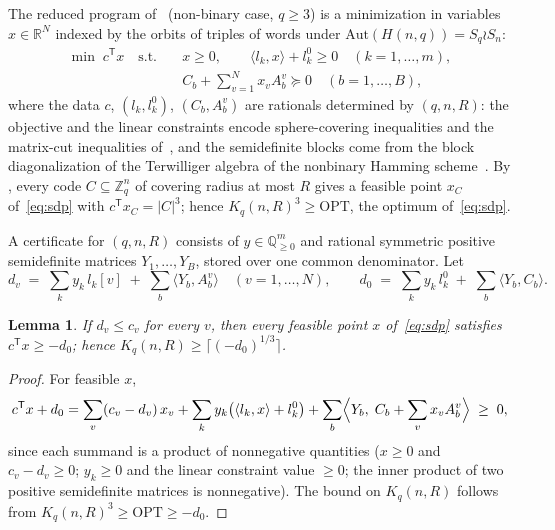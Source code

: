 \documentclass[11pt]{amsart}
\newtheorem{lemma}[theorem]{Lemma}
\newcommand{\Zq}{\mathbb{Z}_q}
\begin{document}
The reduced program of~\cite[Theorem~4.18]{GijswijtPolak} (non-binary
case, $q\ge 3$) is a minimization in variables $x\in\mathbb{R}^N$ indexed
by the orbits of triples of words under $\mathrm{Aut}(H(n,q))=S_q\wr S_n$:
\begin{equation}\label{eq:sdp}
\begin{aligned}
\min\; c^{\mathsf T}x
\quad\text{s.t.}\quad
& x\ge 0,\qquad
\langle l_k,x\rangle + l_k^0 \ge 0 \quad (k=1,\dots,m),\\
& C_b + \textstyle\sum_{v=1}^{N} x_v A_b^v \succeq 0 \quad (b=1,\dots,B),
\end{aligned}
\end{equation}
where the data $c$, $(l_k,l_k^0)$, $(C_b,A_b^v)$ are rationals determined
by $(q,n,R)$: the objective and the linear constraints encode
sphere-covering inequalities and the matrix-cut inequalities
of~\cite[Proposition~4.17]{GijswijtPolak}, and the semidefinite blocks
come from the block diagonalization of the Terwilliger algebra of the
nonbinary Hamming scheme~\cite[\S 3]{GijswijtPolak}. By
\cite[Theorem~4.18]{GijswijtPolak}, every code $C\subseteq\Zq^n$ of
covering radius at most $R$ gives a feasible point $x_C$
of~\eqref{eq:sdp} with $c^{\mathsf T}x_C=|C|^3$; hence
$K_q(n,R)^3\ge\mathrm{OPT}$, the optimum of~\eqref{eq:sdp}.

A certificate for $(q,n,R)$ consists of $y\in\mathbb{Q}^m_{\ge 0}$ and
rational symmetric positive semidefinite matrices $Y_1,\dots,Y_B$, stored
over one common denominator. Let
\[
d_v \;=\; \sum_k y_k\, l_k[v] \;+\; \sum_b \langle Y_b, A_b^v\rangle
\quad (v=1,\dots,N),
\qquad
d_0 \;=\; \sum_k y_k\, l_k^0 \;+\; \sum_b \langle Y_b, C_b\rangle .
\]

\begin{lemma}\label{lem:cert}
If $d_v\le c_v$ for every $v$, then every feasible point $x$
of~\eqref{eq:sdp} satisfies $c^{\mathsf T}x\ge -d_0$; hence
$K_q(n,R)\ge\bigl\lceil(-d_0)^{1/3}\bigr\rceil$.
\end{lemma}

\begin{proof}
For feasible $x$,
\[
c^{\mathsf T}x + d_0
= \sum_v (c_v-d_v)\,x_v
+ \sum_k y_k\bigl(\langle l_k,x\rangle + l_k^0\bigr)
+ \sum_b \Bigl\langle Y_b,\; C_b+\sum_v x_v A_b^v\Bigr\rangle
\;\ge\; 0,
\]
since each summand is a product of nonnegative quantities ($x\ge 0$ and
$c_v-d_v\ge 0$; $y_k\ge 0$ and the linear constraint value $\ge 0$; the
inner product of two positive semidefinite matrices is nonnegative). The
bound on $K_q(n,R)$ follows from $K_q(n,R)^3\ge\mathrm{OPT}\ge -d_0$.
\end{proof}
\end{document}
